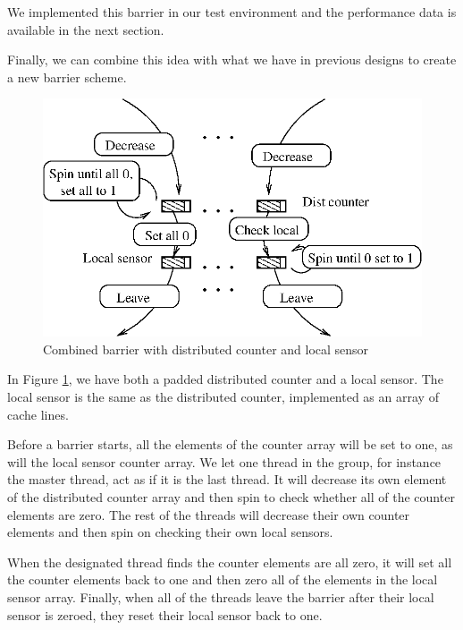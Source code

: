 We implemented this barrier in our test environment and the
performance data is available in the next section. 

Finally, we can combine this idea with what we have in previous
designs to create a new barrier scheme.

\begin{figure}[htbp]
  \begin{center}
    \includegraphics[angle=0, scale=.85]{combined.eps}
    \caption{Combined barrier with distributed counter and local sensor}
    \label{fig:combined}
  \end{center}
\end{figure}

In Figure \ref{fig:combined}, we have both a padded distributed
counter and a local sensor. The local sensor is the same as the
distributed counter, implemented as an array of cache lines.

Before a barrier starts, all the elements of the counter array will be set
to one, as will the local sensor counter array. We let one thread in the group, for
instance the master thread, act as if it is the last thread. It will
decrease its own element of the distributed counter array and then spin to
check whether all of the counter elements are zero. The rest of the
threads will decrease their own counter elements and then spin on
checking their own local sensors. 

When the designated thread finds the counter elements are all zero, it will set
all the counter elements back to one and then zero all of the elements in the
local sensor array.  Finally, when all of the threads leave the barrier after
their local sensor is zeroed, they reset their local sensor back to one.

